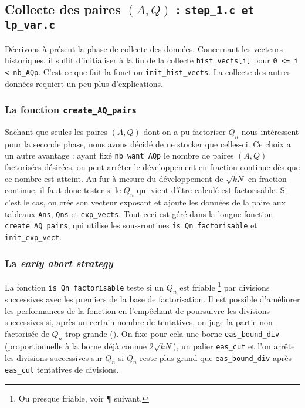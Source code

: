 \subsection{Collecte des paires $(A,Q)$ : \texttt{step\_1.c et lp\_var.c}}

Décrivons à présent la phase de collecte des données. Concernant les vecteurs
historiques, il suffit d'initialiser à la fin de la collecte
\texttt{hist\_vects[i]} pour \texttt{0 <= i < nb\_AQp}. C'est ce que fait la
fonction \texttt{init\_hist\_vects}. La collecte des autres données requiert un
peu plus d'explications. 

\subsubsection{La fonction \texttt{create\_AQ\_pairs}}

Sachant que seules les paires $(A,Q)$ dont on a pu factoriser $Q_n$ nous
intéressent pour la seconde phase, nous avons décidé de ne stocker que
celles-ci. Ce choix a un autre avantage : ayant fixé \texttt{nb\_want\_AQp} le
nombre de paires $(A, Q)$ factorisées désirées, on peut arrêter le
développement en fraction continue dès que ce nombre est atteint. Au fur à
mesure du développement de $\sqrt{kN}$ en fraction continue, il faut donc
tester si le $Q_n$ qui vient d'être calculé est factorisable. Si c'est le cas,
on crée son vecteur exposant et ajoute les données de la paire aux tableaux
\texttt{Ans}, \texttt{Qns} et \texttt{exp\_vects}. Tout ceci est géré dans la
longue fonction \texttt{create\_AQ\_pairs}, qui utilise les sous-routines
\texttt{is\_Qn\_factorisable} et \texttt{init\_exp\_vect}.


\subsubsection{La \textit{early abort strategy}}

La fonction \texttt{is\_Qn\_factorisable} teste si un $Q_n$ est friable
\footnote{Ou presque friable, voir ¶ suivant.} par divisions successives avec
les premiers de la base de factorisation. Il est possible d'améliorer les
performances de la fonction en l'empêchant de poursuivre les divisions 
successives si, après un certain nombre de tentatives, on juge la partie non 
factorisée de $Q_n$ trop grande (\cite{PW}). On fixe pour cela une borne
\texttt{eas\_bound\_div} (proportionnelle à la borne déjà connue $2\sqrt{kN}$),
un palier \texttt{eas\_cut} et l'on arrête les divisions successives sur $Q_n$ 
si $Q_n$ reste plus grand que \texttt{eas\_bound\_div} après \texttt{eas\_cut}
tentatives de divisions.

